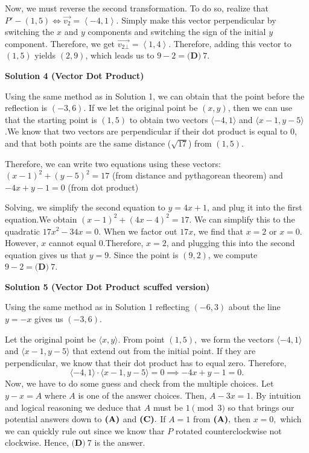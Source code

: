 \begin{enumerate}
 Now, we must reverse the second transformation. To do so, realize that $P'-(1,5)\Leftrightarrow \overrightarrow{v_{2}}=\left\langle -4,1 \right\rangle$. Simply make this vector perpendicular by switching the $x$ and $y$ components and switching the sign of the initial $y$ component. Therefore, we get $\overrightarrow{v_{2\bot }}=\left\langle 1,4 \right\rangle$. Therefore, adding this vector to $(1,5)$ yields $(2,9)$, which leads us to $9-2 = \boxed{\textbf{(D)} ~7}$.

 



\textbf{Solution 4 (Vector Dot Product)}

Using the same method as in Solution 1, we can obtain that the point before the reflection is $(-3,6)$. If we let the original point be $(x, y)$, then we can use that the starting point is $(1,5)$ to obtain two vectors $\langle -4,1 \rangle$ and $\langle x-1, y-5 \rangle$.We know that two vectors are perpendicular if their dot product is equal to $0$, and that both points are the same distance ($\sqrt {17}$) from $(1,5)$. 

 Therefore, we can write two equations using these vectors:$(x-1)^2 + (y-5)^2 = 17$ (from distance and pythagorean theorem) and $-4x+y-1 = 0$ (from dot product)

 Solving, we simplify the second equation to $y=4x+1$, and plug it into the first equation.We obtain $(x-1)^2 + (4x-4)^2 = 17$. We can simplify this to the quadratic $17x^2-34x=0$. When we factor out $17x$, we find that $x = 2$ or $x = 0$. However, $x$ cannot equal $0$.Therefore, $x = 2$, and plugging this into the second equation gives us that $y = 9$. Since the point is $(9, 2)$, we compute $9-2 = \boxed{\textbf{(D)} ~7}$.

 


 



\textbf{Solution 5 (Vector Dot Product scuffed version)}

Using the same method as in Solution 1 reflecting $(-6,3)$ about the line $y = -x$ gives us $(-3,6).$

 Let the original point be $\langle x,y \rangle.$ From point $(1,5),$ we form the vectors $\langle -4,1 \rangle$ and $\langle x-1, y-5 \rangle$ that extend out from the initial point. If they are perpendicular, we know that their dot product has to equal zero. Therefore, 
 \[\langle -4,1 \rangle \cdot \langle x-1, y-5 \rangle = 0 \implies -4x+y-1= 0.\]Now, we have to do some guess and check from the multiple choices. Let $y - x = A$ where $A$ is one of the answer choices. Then, $A -3x = 1.$ By intuition and logical reasoning we deduce that $A$ must be $1 \pmod 3$ so that brings our potential answers down to $\text{\textbf{(A)}}$ and $\text{\textbf{(C)}}.$ If $A = 1$ from $\text{\textbf{(A)}},$ then $x = 0,$ which we can quickly rule out since we know thar $P$ rotated counterclockwise not clockwise. Hence, $\boxed{\textbf{(D)} ~7}$ is the answer.


\end{enumerate}
